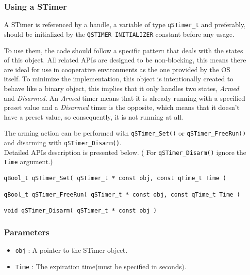 \documentclass{article}
\begin{document}
\subsubsection{Using a STimer}
A STimer is referenced by a handle, a variable of type \lstinline{qSTimer_t}  and preferably, should be initialized by the \lstinline{QSTIMER_INITIALIZER} constant before any usage. 

To use them, the code should follow a specific pattern that deals with the states of this object. All related APIs are designed to be non-blocking, this means there are ideal for use in cooperative environments as the one provided by the OS itself. To minimize the implementation, this object is intentionally created to behave like a binary object, this implies that it only handles two states, \textit{Armed} and \textit{Disarmed}. 
\newline
An \textit{Armed} timer means that it is already running with a specified preset value and a \textit{Disarmed} timer is the opposite, which means that it doesn't have a preset value, so consequently, it is not running at all.

The arming action can be performed with \lstinline{qSTimer_Set()}  or \lstinline{qSTimer_FreeRun()}  and disarming with \lstinline{qSTimer_Disarm()}. \\

Detailed APIs description is presented below. ( For \lstinline{qSTimer_Disarm()} ignore the \lstinline{Time} argument.)\\

\begin{lstlisting}[style=CStyle]
qBool_t qSTimer_Set( qSTimer_t * const obj, const qTime_t Time )
\end{lstlisting}

\begin{lstlisting}[style=CStyle]
qBool_t qSTimer_FreeRun( qSTimer_t * const obj, const qTime_t Time )
\end{lstlisting}

\begin{lstlisting}[style=CStyle]
void qSTimer_Disarm( qSTimer_t * const obj )
\end{lstlisting}

\subsubsection*{Parameters}
\begin{itemize}
    \item \lstinline{obj} : A pointer to the STimer object. 
    \item \lstinline{Time} : The expiration time(must be specified in seconds).
\end{itemize}
\end{document}

